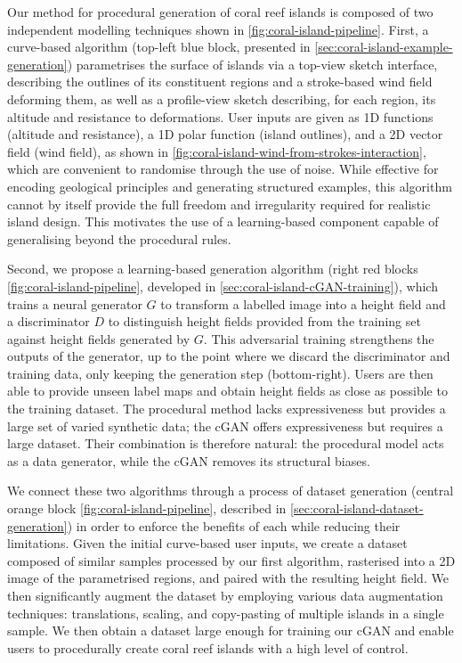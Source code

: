 Our method for procedural generation of coral reef islands is composed of two independent modelling techniques shown in \cref{fig:coral-island-pipeline}. First, a curve-based algorithm (top-left blue block, presented in \cref{sec:coral-island-example-generation}) parametrises the surface of islands via a top-view sketch interface, describing the outlines of its constituent regions and a stroke-based wind field deforming them, as well as a profile-view sketch describing, for each region, its altitude and resistance to deformations. User inputs are given as 1D functions (altitude and resistance), a 1D polar function (island outlines), and a 2D vector field (wind field), as shown in \cref{fig:coral-island-wind-from-strokes-interaction}, which are convenient to randomise through the use of noise. While effective for encoding geological principles and generating structured examples, this algorithm cannot by itself provide the full freedom and irregularity required for realistic island design. This motivates the use of a learning-based component capable of generalising beyond the procedural rules.

Second, we propose a learning-based generation algorithm (right red blocks \cref{fig:coral-island-pipeline}, developed in \cref{sec:coral-island-cGAN-training}), which trains a neural generator $G$ to transform a labelled image into a height field and a discriminator $D$ to distinguish height fields provided from the training set against height fields generated by $G$. This adversarial training strengthens the outputs of the generator, up to the point where we discard the discriminator and training data, only keeping the generation step (bottom-right). Users are then able to provide unseen label maps and obtain height fields as close as possible to the training dataset. The procedural method lacks expressiveness but provides a large set of varied synthetic data; the cGAN offers expressiveness but requires a large dataset. Their combination is therefore natural: the procedural model acts as a data generator, while the cGAN removes its structural biases.


We connect these two algorithms through a process of dataset generation (central orange block \cref{fig:coral-island-pipeline}, described in \cref{sec:coral-island-dataset-generation}) in order to enforce the benefits of each while reducing their limitations. Given the initial curve-based user inputs, we create a dataset composed of similar samples processed by our first algorithm, rasterised into a 2D image of the parametrised regions, and paired with the resulting height field. We then significantly augment the dataset by employing various data augmentation techniques: translations, scaling, and copy-pasting of multiple islands in a single sample. We then obtain a dataset large enough for training our cGAN and enable users to procedurally create coral reef islands with a high level of control.

